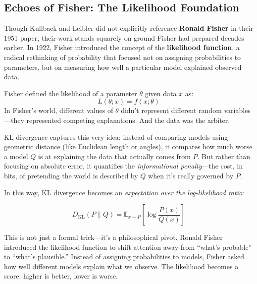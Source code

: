 \subsection{Echoes of Fisher: The Likelihood Foundation}

Though Kullback and Leibler did not explicitly reference \textbf{Ronald Fisher} in their 1951 paper, their work stands squarely on ground Fisher had prepared decades earlier. In 1922, Fisher introduced the concept of the \textbf{likelihood function}, a radical rethinking of probability that focused not on assigning probabilities to parameters, but on measuring how well a particular model explained observed data.

Fisher defined the likelihood of a parameter \( \theta \) given data \( x \) as:
\[
L(\theta; x) = f(x; \theta)
\]
In Fisher’s world, different values of \( \theta \) didn’t represent different random variables—they represented competing explanations. And the data was the arbiter.


KL divergence captures this very idea: instead of comparing models using geometric distance (like Euclidean length or angles), it compares how much worse a model \( Q \) is at explaining the data that actually comes from \( P \). But rather than focusing on absolute error, it quantifies the \emph{informational penalty}—the cost, in bits, of pretending the world is described by \( Q \) when it’s really governed by \( P \).

In this way, KL divergence becomes an \emph{expectation over the log-likelihood ratio}:

\[
D_{\mathrm{KL}}(P \parallel Q) = \mathbb{E}_{x \sim P} \left[ \log \frac{P(x)}{Q(x)} \right]
\]

This is not just a formal trick—it’s a philosophical pivot. Ronald Fisher introduced the likelihood function to shift attention away from “what’s probable” to “what’s plausible.” Instead of assigning probabilities to models, Fisher asked how well different models explain what we observe. The likelihood becomes a score: higher is better, lower is worse.

\vspace{1em}


